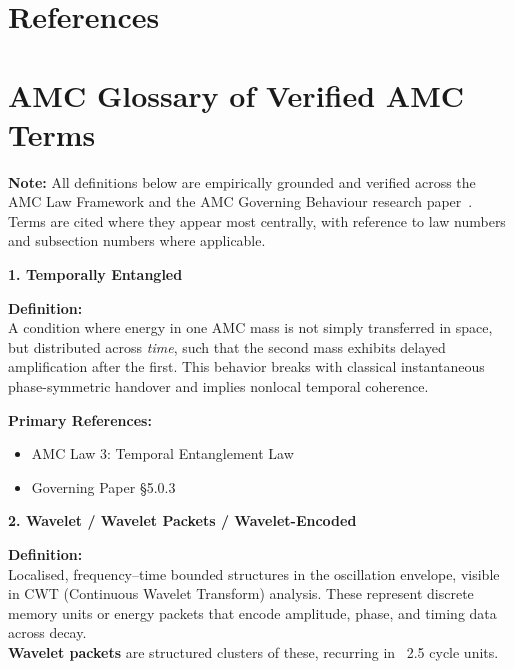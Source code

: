\documentclass[10pt,aps,pre,onecolumn,superscriptaddress,notitlepage]{revtex4-2}
\begin{document}
\section{References}
\label{sec:references}




\clearpage
\appendix

\section{AMC Glossary of Verified AMC Terms}
\label{sec:appendixA}
\noindent\textbf{Note:} All definitions below are empirically grounded and verified across the AMC Law Framework and the AMC Governing Behaviour research paper~\cite{karim2025governing}. Terms are cited where they appear most centrally, with reference to law numbers and subsection numbers where applicable.

\vspace{1em}

\noindent\textbf{1. Temporally Entangled}

\textbf{Definition:} \\
A condition where energy in one AMC mass is not simply transferred in space, but distributed across \textit{time}, such that the second mass exhibits delayed amplification after the first. This behavior breaks with classical instantaneous phase-symmetric handover and implies nonlocal temporal coherence.

\textbf{Primary References:}
\begin{itemize}[leftmargin=1.5em]
  \item AMC Law 3: Temporal Entanglement Law
  \item Governing Paper §5.0.3
\end{itemize}

\vspace{1em}

\noindent\textbf{2. Wavelet / Wavelet Packets / Wavelet-Encoded}

\textbf{Definition:} \\
Localised, frequency–time bounded structures in the oscillation envelope, visible in CWT (Continuous Wavelet Transform) analysis. These represent discrete memory units or energy packets that encode amplitude, phase, and timing data across decay. \\
\textbf{Wavelet packets} are structured clusters of these, recurring in ~2.5 cycle units.
\end{document}
